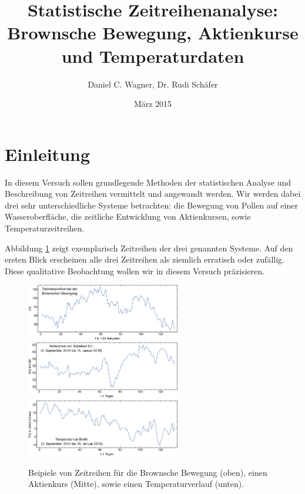 \documentclass[a4paper,10pt]{article}
\title{Statistische Zeitreihenanalyse: \\ Brownsche Bewegung, Aktienkurse und Temperaturdaten}
\author{Daniel C. Wagner, Dr. Rudi Schäfer}
\date{März 2015}
\begin{document}
\maketitle


\section{Einleitung}

In diesem Versuch sollen grundlegende Methoden der statistischen Analyse und Beschreibung von Zeitreihen vermittelt und angewandt werden. 
Wir werden dabei drei sehr unterschiedliche Systeme betrachten: die Bewegung von Pollen auf einer Wasseroberfläche, die zeitliche Entwicklung von Aktienkursen, sowie Temperaturzeitreihen. 

Abbildung \ref{fig1} zeigt exemplarisch Zeitreihen der drei genannten Systeme.
Auf den ersten Blick erscheinen alle drei Zeitreihen als ziemlich erratisch oder zufällig. Diese qualitative Beobachtung wollen wir in diesem Versuch präzisieren.

\begin{figure}[htbp]
\begin{center}
\includegraphics[width=0.6\textwidth]{a1.pdf}\\[1ex]
\includegraphics[width=0.6\textwidth]{a2.pdf}\\[1ex]
\includegraphics[width=0.6\textwidth]{a3.pdf}
\caption{Beipiele von Zeitreihen für die Brownsche Bewegung (oben), einen Aktienkurs (Mitte), sowie einen Temperaturverlauf (unten).}
\label{fig1}
\end{center}
\end{figure}
\end{document}
